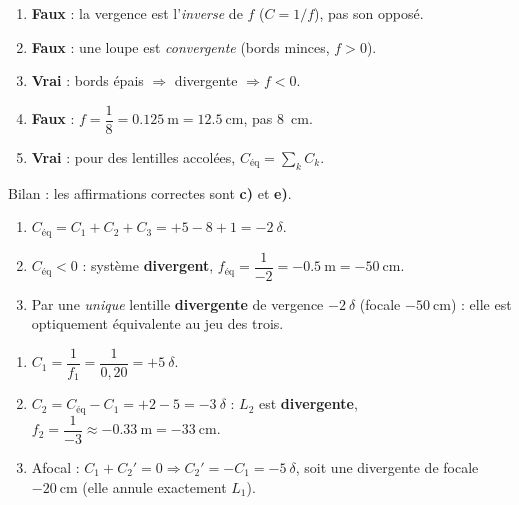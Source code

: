 \documentclass[11pt,a4paper]{article}
\begin{document}

\begin{corrige}
\begin{enumerate}[label=\alph*)]
  \item \textbf{Faux} : la vergence est l'\emph{inverse} de $f$ ($C=1/f$), pas son opposé.
  \item \textbf{Faux} : une loupe est \emph{convergente} (bords minces, $f>0$).
  \item \textbf{Vrai} : bords épais $\Rightarrow$ divergente $\Rightarrow f<0$.
  \item \textbf{Faux} : $f=\dfrac{1}{8}=\qty{0.125}{\m}=\qty{12.5}{\cm}$, pas \qty{8}{\cm}.
  \item \textbf{Vrai} : pour des lentilles accolées, $C_{\text{éq}}=\sum_k C_k$.
\end{enumerate}
Bilan : les affirmations correctes sont \textbf{c)} et \textbf{e)}.
\end{corrige}

\begin{corrige}
\begin{enumerate}[label=\alph*)]
  \item $C_{\text{éq}}=C_1+C_2+C_3=+5-8+1=-2~\delta$.
  \item $C_{\text{éq}}<0$ : système \textbf{divergent},
        $f_{\text{éq}}=\dfrac{1}{-2}=-\qty{0.5}{\m}=-\qty{50}{\cm}$.
  \item Par une \emph{unique} lentille \textbf{divergente} de vergence $-2~\delta$ (focale
        $-\qty{50}{\cm}$) : elle est optiquement équivalente au jeu des trois.
\end{enumerate}
\end{corrige}

\begin{corrige}
\begin{enumerate}[label=\alph*)]
  \item $C_1=\dfrac{1}{f_1}=\dfrac{1}{0,20}=+5~\delta$.
  \item $C_2=C_{\text{éq}}-C_1=+2-5=-3~\delta$ : $L_2$ est \textbf{divergente},
        $f_2=\dfrac{1}{-3}\approx-\qty{0.33}{\m}=-\qty{33}{\cm}$.
  \item Afocal : $C_1+C_2'=0\Rightarrow C_2'=-C_1=-5~\delta$, soit une divergente de focale
        $-\qty{20}{\cm}$ (elle annule exactement $L_1$).
\end{enumerate}
\end{corrige}
\end{document}
